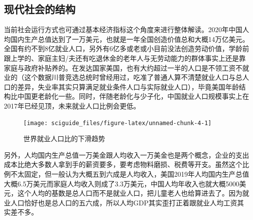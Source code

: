 \documentclass[]{tufte-book}
\newenvironment{Shaded}{}{}
\newcommand{\AttributeTok}[1]{\textcolor[rgb]{0.49,0.56,0.16}{#1}}
\newcommand{\CommentTok}[1]{\textcolor[rgb]{0.38,0.63,0.69}{\textit{#1}}}
\newcommand{\DecValTok}[1]{\textcolor[rgb]{0.25,0.63,0.44}{#1}}
\newcommand{\FunctionTok}[1]{\textcolor[rgb]{0.02,0.16,0.49}{#1}}
\newcommand{\NormalTok}[1]{#1}
\newcommand{\OtherTok}[1]{\textcolor[rgb]{0.00,0.44,0.13}{#1}}
\newcommand{\SpecialCharTok}[1]{\textcolor[rgb]{0.25,0.44,0.63}{#1}}
\newcommand{\StringTok}[1]{\textcolor[rgb]{0.25,0.44,0.63}{#1}}
\begin{document}
\hypertarget{ux73b0ux4ee3ux793eux4f1aux7684ux7ed3ux6784}{%
\subsection{现代社会的结构}\label{ux73b0ux4ee3ux793eux4f1aux7684ux7ed3ux6784}}

当前社会运行方式也可通过基本经济指标这个角度来进行整体解读。2020年中国人均国内生产总值达到了一万美元，也就是一年全国创造价值总和大概14万亿美元。全国有约不到8亿就业人口，另外有6亿多或老或小目前没法创造劳动价值，学龄前跟上学的、家庭主妇/夫还有吃退休金的老年人与无劳动能力的群体事实上还是靠家庭与政府补贴养的。在发达国家美国，也有大约超过一半的人口是不领工资不就业的（这个数据川普竞选总统时曾经用过，吃准了普通人算不清楚就业人口与总人口的差异，失业率其实只算满足就业条件人口与实际就业人口），毕竟美国年龄结构比中国更老龄化一些。同时，伴随老龄化与少子化，中国就业人口规模事实上在2017年已经见顶，未来就业人口比例会更低。

\begin{Shaded}
\end{Shaded}

\begin{figure}
\texttt{[image: sciguide\_files/figure-latex/unnamed-chunk-4-1]} \caption[世界就业人口比的下滑趋势]{世界就业人口比的下滑趋势}\label{fig:unnamed-chunk-4}
\end{figure}

另外，人均国内生产总值一万美金跟人均收入一万美金也是两个概念，企业的支出成本比绝大多数人拿到手的薪资要多，要考虑物料磨损、税费等开支。虽然这个比例不太固定，但一般认为大概五到六成是人均收入，美国2019年人均国内生产总值大概6.5万美元而家庭人均收入则成了3.3万美元，中国人均年收入也就大概5000美元，这个人均的基数是总人口而不是就业人口，把儿童老人也给算进去了。因为就业人口恰好也是总人口的五六成，所以人均GDP其实歪打正着跟就业人均工资其实差不多。
\end{document}
